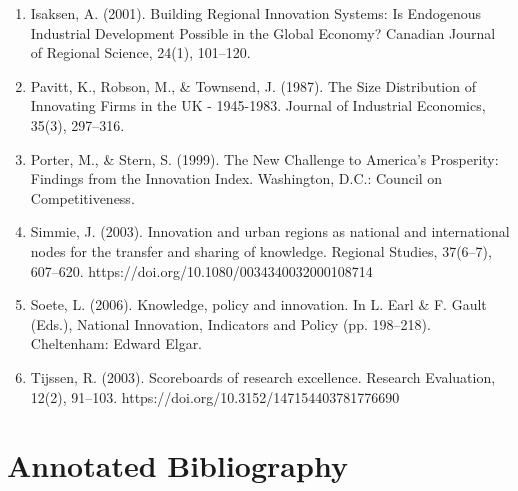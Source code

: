 \documentclass[a4paper,11pt]{article}
\begin{document}
\begin{enumerate}
\item Isaksen, A. (2001). Building Regional Innovation Systems: Is Endogenous Industrial Development Possible in the Global Economy? Canadian Journal of Regional Science, 24(1), 101–120.
\item Pavitt, K., Robson, M., \& Townsend, J. (1987). The Size Distribution of Innovating Firms in the UK - 1945-1983. Journal of Industrial Economics, 35(3), 297–316.
\item Porter, M., \& Stern, S. (1999). The New Challenge to America’s Prosperity: Findings from the Innovation Index. Washington, D.C.: Council on Competitiveness.
\item Simmie, J. (2003). Innovation and urban regions as national and international nodes for the transfer and sharing of knowledge. Regional Studies, 37(6–7), 607–620. https://doi.org/10.1080/0034340032000108714
\item Soete, L. (2006). Knowledge, policy and innovation. In L. Earl \& F. Gault (Eds.), National Innovation, Indicators and Policy (pp. 198–218). Cheltenham: Edward Elgar.
\item Tijssen, R. (2003). Scoreboards of research excellence. Research Evaluation, 12(2), 91–103. https://doi.org/10.3152/147154403781776690
\end{enumerate}

\section{Annotated Bibliography}
\label{annotated_bib}





\end{document}
